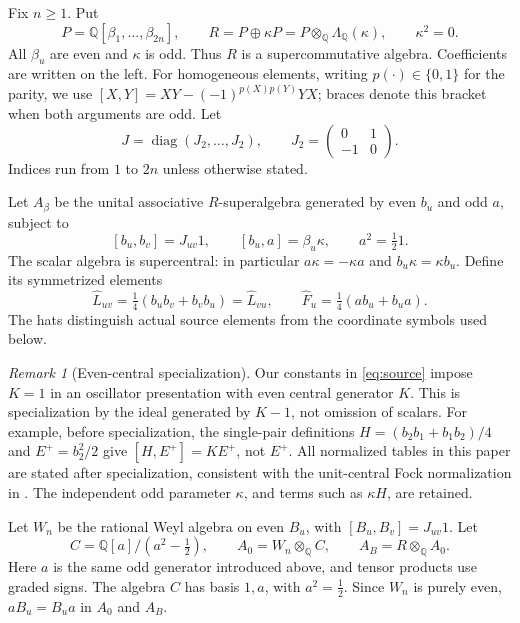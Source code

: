 \documentclass[11pt]{article}
\numberwithin{equation}{section}
\theoremstyle{remark}
\newtheorem{remark}[theorem]{Remark}
\begin{document}
Fix $n\geq1$. Put
\[
 P=\mathbb Q[\beta_1,\ldots,\beta_{2n}],\qquad
 R=P\oplus\kappa P=P\otimes_{\mathbb Q}\Lambda_{\mathbb Q}(\kappa),
 \qquad \kappa^2=0.
\]
All $\beta_u$ are even and $\kappa$ is odd. Thus
$R$ is a supercommutative algebra. Coefficients are written on the left.
For homogeneous elements, writing $p(\cdot)\in\{0,1\}$ for the parity, we use
$[X,Y]=XY-(-1)^{p(X)p(Y)}YX$; braces denote this bracket when both arguments
are odd. Let
\[
 J=\operatorname{diag}(J_2,\ldots,J_2),\qquad
 J_2=\begin{pmatrix}0&1\\-1&0\end{pmatrix}.
\]
Indices run from $1$ to $2n$ unless otherwise stated.

Let $A_\beta$ be the unital associative $R$-superalgebra generated by even
$b_u$ and odd $a$, subject to
\begin{equation}\label{eq:source}
 [b_u,b_v]=J_{uv}1,\qquad [b_u,a]=\beta_u\kappa,
 \qquad a^2=\tfrac{1}{2} 1.
\end{equation}
The scalar algebra is supercentral: in particular
$a\kappa=-\kappa a$ and $b_u\kappa=\kappa b_u$.
Define its symmetrized elements
\begin{equation}\label{eq:lifts}
 \widehat L_{uv}=\tfrac{1}{4}(b_ub_v+b_vb_u)=\widehat L_{vu},\qquad
 \widehat F_u=\tfrac{1}{4}(ab_u+b_ua).
\end{equation}
The hats distinguish actual source elements from the coordinate symbols used below.

\begin{remark}[Even-central specialization]\label{rem:central}
Our constants in \eqref{eq:source} impose $K=1$ in an oscillator presentation
with even central generator $K$. This is specialization by the ideal generated
by $K-1$, not omission of scalars. For example, before specialization, the
single-pair definitions $H=(b_2b_1+b_1b_2)/4$ and $E^+=b_2^2/2$ give
$[H,E^+]=KE^+$, not $E^+$. All normalized tables in this paper are stated
after specialization, consistent with the unit-central Fock normalization in
\cite[Section~4]{BS17}. The independent odd parameter $\kappa$, and terms such
as $\kappa H$, are retained.
\end{remark}

Let $W_n$ be the rational Weyl algebra on even $B_u$, with
$[B_u,B_v]=J_{uv}1$. Let
\[
 C=\mathbb Q[a]/(a^2-\tfrac{1}{2}),\qquad
 A_0=W_n\otimes_{\mathbb Q}C,\qquad A_B=R\otimes_{\mathbb Q}A_0.
\]
Here $a$ is the same odd generator introduced above, and tensor products use
graded signs. The algebra $C$ has basis $1,a$, with $a^2=\tfrac{1}{2}$. Since
$W_n$ is purely even, $aB_u=B_ua$ in $A_0$ and $A_B$.
\end{document}
